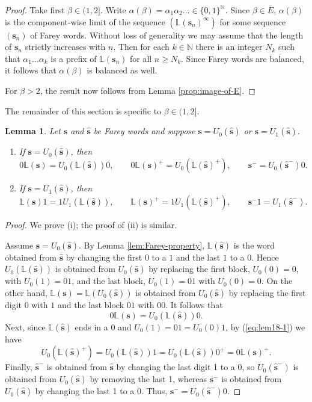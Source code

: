 \documentclass[11pt]{amsart}
\newtheorem{lemma}[theorem]{Lemma}
\theoremstyle{definition}
\theoremstyle{remark}
\numberwithin{equation}{section}
\newcommand{\N}{\ensuremath{\mathbb{N}}}
\renewcommand{\L}{\ensuremath{\mathbb{L}}}
\newcommand{\s}{ {\mathbf{s}}}
\newcommand{\f}{\infty}
\newcommand{\al}{\alpha}
\begin{document}
\begin{proof}
{Take first $\beta\in(1,2]$.}
Write $\alpha(\beta)=\alpha_1\alpha_2\dots\in\{0,1\}^\N$. %
Since $\beta\in \overline{E}$, $\alpha(\beta)$ is the component-wise limit of the sequence $(\L(\s_n)^\f)$ for some sequence $(\s_n)$ of Farey words. Without loss of generality we may assume that the length of $\s_n$ strictly increases with $n$. Then for each $k\in\N$ there is an integer $N_k$ such that $\alpha_1\dots\alpha_k$ is a prefix of $\L(\s_n)$ for all $n\geq N_k$. Since Farey words are balanced, it follows that $\al(\beta)$ is balanced as well.

{For $\beta>2$, the result now follows from Lemma \ref{prop:image-of-E}.}
\end{proof}

{The remainder of this section is specific to $\beta\in(1,2]$.}

\begin{lemma} \label{lem:eta-and-xi}
Let $\s$ and $\hat{\s}$ be Farey words and suppose $\s=U_0(\hat{\s})$ or $\s=U_1(\hat{\s})$.
\begin{enumerate}[{\rm(i)}]
\item If $\s=U_0(\hat{\s})$, then
\[
0\L(\s)=U_0(\L(\hat{\s}))0, \qquad 0\L(\s)^+=U_0(\L(\hat{\s})^+), \qquad \s^-=U_0(\hat{\s}^-)0.
\]
\item If $\s=U_1(\hat{\s})$, then
\[
\L(\s)1=1U_1(\L(\hat{\s})), \qquad \L(\s)^+=1U_1(\L(\hat{\s})^+), \qquad \s^-1=U_1(\hat{\s}^-).
\]
\end{enumerate}
\end{lemma}

\begin{proof}
We prove (i); the proof of (ii) is similar.

Assume $\s=U_0(\hat{\s})$. By Lemma \ref{lem:Farey-property}, $\L(\hat{\s})$ is the word obtained from $\hat{\s}$ by changing the first $0$ to a $1$ and the last $1$ to a $0$. Hence $U_0(\L(\hat{\s}))$ is obtained from $U_0(\hat{\s})$ by replacing the first block, $U_0(0)=0$, with $U_0(1)=01$, and the last block, $U_0(1)=01$ with $U_0(0)=0$. On the other hand, $\L(\s)=\L(U_0(\hat{\s}))$ is obtained from $U_0(\hat\s)$ by replacing the first digit $0$ with $1$ and the last block $01$ with $00$. It follows that
\begin{equation}\label{eq:lem18-1}
0\L(\s)=U_0(\L(\hat{\s}))0.
\end{equation}
Next, since $\L(\hat{\s})$ ends in a $0$ and $U_0(1)=01=U_0(0)1$, by (\ref{eq:lem18-1}) we have
\[
U_0(\L(\hat{\s})^+)=U_0(\L(\hat{\s}))1=U_0(\L(\hat{\s}))0^+=0\L(\s)^+.
\]
Finally, $\hat{\s}^-$ is obtained from $\hat{\s}$ by changing the last digit 1 to a 0, so $U_0(\hat{\s}^-)$ is obtained from $U_0(\hat{\s})$ by removing the last 1, whereas $\s^-$ is obtained from $U_0(\hat{\s})$ by changing the last 1 to a 0. Thus, $\s^-=U_0(\hat{\s}^-)0$.
\end{proof}
\end{document}
